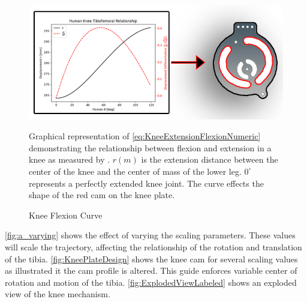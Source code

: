 \begin{figure}[ht!]
    \centering
    \includegraphics[scale=0.9]{images/mech_design/knee_plate_main_annotated.png}
    \caption{Knee Flexion Curve}{Graphical representation of \autoref{eq:KneeExtensionFlexionNumeric} demonstrating the relationship between flexion and extension in a knee as measured by \cite{KinDynKneeJoint}. \(r(m)\) is the extension distance between the center of the knee and the center of mass of the lower leg. $0^\circ$ represents a perfectly extended knee joint. The curve effects the shape of the red cam on the knee plate. }
    \label{fig:FlexExtRelationship}
\end{figure} 


\autoref{fig:a_varying} shows the effect of varying the scaling parameters. These values will scale the trajectory, affecting the relationship of the rotation and translation of the tibia. \autoref{fig:KneePlateDesign} shows the knee cam for several scaling values as illustrated it the cam profile is altered. This guide enforces variable center of rotation and motion of the tibia. \autoref{fig:ExplodedViewLabeled} shows an exploded view of the knee mechanism. 

